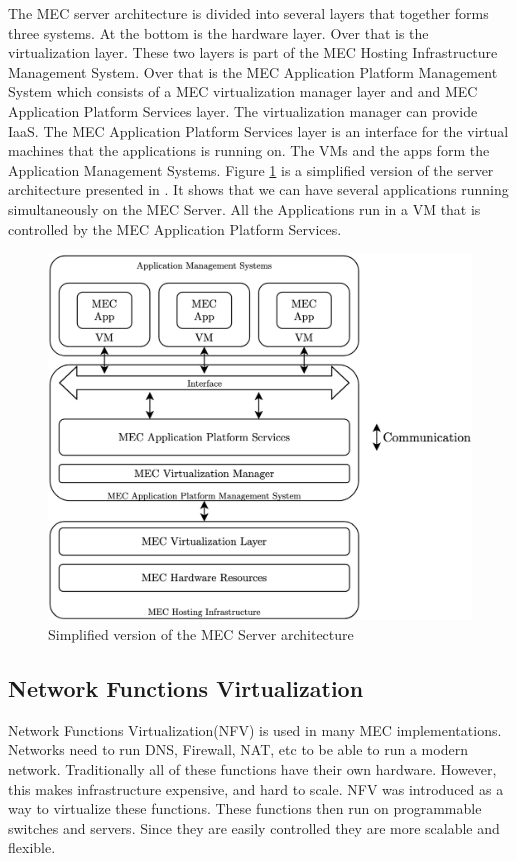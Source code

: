 The MEC server architecture is divided into several layers that together forms three systems\cite{patel_mec_nodate}. At the bottom is the hardware layer. Over that is the virtualization layer. These two layers is part of the MEC Hosting Infrastructure Management System. Over that is the MEC Application Platform Management System which consists of a MEC virtualization manager layer and and MEC Application Platform Services layer. The virtualization manager can provide IaaS. The MEC Application Platform Services layer is an interface for the virtual machines that the applications is running on. The VMs and the apps form the Application Management Systems. Figure \ref{fig:MEC_Server} is a simplified version of the server architecture presented in \cite{patel_mec_nodate}. It shows that we can have several applications running simultaneously on the MEC Server. All the Applications run in a VM that is controlled by the MEC Application Platform Services.
\begin{figure}[t]
    \centering
    \includegraphics[scale=0.3]{chapters/4_architectures/figures/MEC_server_screenshot.png}
    \caption{Simplified version of the MEC Server architecture}
    \label{fig:MEC_Server}
\end{figure}

\subsection{Network Functions Virtualization}
Network Functions Virtualization(NFV) is used in many MEC implementations\cite{patel_mec_nodate}. Networks need to run DNS, Firewall, NAT, etc to be able to run a modern network. Traditionally all of these functions have their own hardware. However, this makes infrastructure expensive, and hard to scale. NFV was introduced as a way to virtualize these functions. These functions then run on programmable switches and servers. Since they are easily controlled they are more scalable and flexible.

